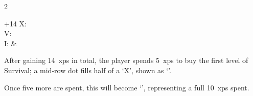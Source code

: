 \begin{multicols}{2}
\begin{nametable}[rcccccccccc]{+14 }
  X: 
  \\
  V: %
  \\
  I: &  \Circle
  \\
\end{nametable}

\begin{exampletext}
  After gaining 14~\glspl{xp} in total, the player spends 5~\glspl{xp} to buy the first level of Survival; a mid-row dot fills half of a `X', shown as `\XPboxSpent'.

  Once five more are spent, this will become `\Diamondblack', representing a full 10~\glspl{xp} spent.
\end{exampletext}

\newcommand\describeFullCycle{%
  \showCycle~\arabic{fenestraDay}%
}

\setcounter{xp}{0}
\newcommand\runningXPtotal[1]{%
  \addtocounter{xp}{#1}%
  \setcounter{fp}{\value{xp}}%
  \divide\value{fp} by 10%
  \addtocounter{fp}{0}%
  \arabic{xp}
}

\setcounter{r12}{\month}
\setcounter{track}{\day}
\addtocounter{track}{20}

\newcommand\realMonth[1][7]{%
  \addtocounter{track}{#1}%
  \ifnum\value{r12}=2%
    \ifnum\value{track}>28%
      \addtocounter{track}{-28}%
      \stepcounter{r12}%
      \ifnum\value{r12}>12%
        \setcounter{r12}{1}%
      \fi%
    \fi%
  \else%
    \ifnum\value{track}>31%
      \addtocounter{track}{-31}%
      \stepcounter{r12}%
      \ifnum\value{r12}>12%
        \setcounter{r12}{1}%
      \fi%
    \fi%
  \fi%
  \trackMonth[r12]~\arabic{track}%
  \setCycle{\value{r12}}{\value{track}}%
}


\end{multicols}
